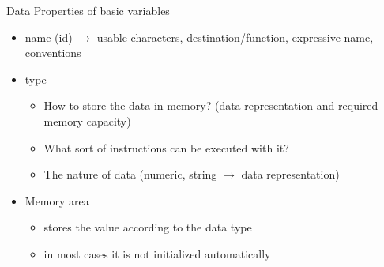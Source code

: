 \documentclass[usenames,dvipsnames,aspectratio=169]{beamer}
\begin{document}
\begin{frame}{Data}
  Properties of basic variables
  \begin{itemize}
    \item name (id) $\to$ usable characters, destination/function,
expressive name, conventions
    \item type
    \begin{itemize}
      \item How to store the data in memory? (data representation and required memory capacity)
      \item What sort of instructions can be executed with it?
      \item The nature of data (numeric, string $\to$ data representation)
    \end{itemize}
    \item Memory area
    \begin{itemize}
      \item stores the value according to the data type
      \item in most cases it is not initialized automatically
    \end{itemize}
  \end{itemize}
\end{frame}
\end{document}
